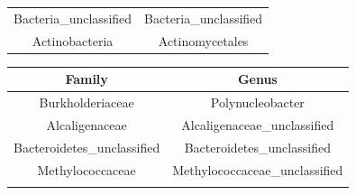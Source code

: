 \documentclass[]{article}
\begin{document}
\begin{longtable}[]{@{}cc@{}}
\begin{minipage}[t]{0.38\columnwidth}
Bacteria\_unclassified\strut
\end{minipage} & \begin{minipage}[t]{0.38\columnwidth}\centering
Bacteria\_unclassified\strut
\end{minipage}\tabularnewline
\begin{minipage}[t]{0.38\columnwidth}\centering
Actinobacteria\strut
\end{minipage} & \begin{minipage}[t]{0.38\columnwidth}\centering
Actinomycetales\strut
\end{minipage}\tabularnewline
\bottomrule
\end{longtable}

\begin{longtable}[]{@{}cc@{}}
\toprule
\begin{minipage}[b]{0.38\columnwidth}\centering
Family\strut
\end{minipage} & \begin{minipage}[b]{0.42\columnwidth}\centering
Genus\strut
\end{minipage}\tabularnewline
\midrule
\endhead
\begin{minipage}[t]{0.38\columnwidth}\centering
Burkholderiaceae\strut
\end{minipage} & \begin{minipage}[t]{0.42\columnwidth}\centering
Polynucleobacter\strut
\end{minipage}\tabularnewline
\begin{minipage}[t]{0.38\columnwidth}\centering
Alcaligenaceae\strut
\end{minipage} & \begin{minipage}[t]{0.42\columnwidth}\centering
Alcaligenaceae\_unclassified\strut
\end{minipage}\tabularnewline
\begin{minipage}[t]{0.38\columnwidth}\centering
Bacteroidetes\_unclassified\strut
\end{minipage} & \begin{minipage}[t]{0.42\columnwidth}\centering
Bacteroidetes\_unclassified\strut
\end{minipage}\tabularnewline
\begin{minipage}[t]{0.38\columnwidth}\centering
Methylococcaceae\strut
\end{minipage} & \begin{minipage}[t]{0.42\columnwidth}\centering
Methylococcaceae\_unclassified\strut
\end{minipage}\tabularnewline
\begin{minipage}[t]{0.38\columnwidth}\centering

\end{minipage}
\end{longtable}
\end{document}
